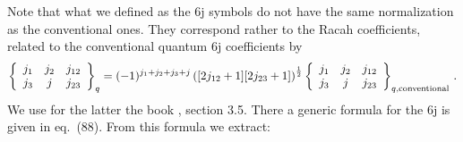 \documentclass[11pt]{article}
\begin{document}
Note that what we defined as the 6j symbols do not have the same normalization as the conventional ones. They correspond rather to the Racah coefficients, related to the conventional quantum 6j coefficients by 
\begin{equation}
 \left\{  \begin{array}{ccc}
  j_1 & j_2 & j_{12} \\ j_3 & j & j_{23}  \\ \end{array}   \right\}_q =  (-1)^{j_1 + j_2 + j_3 + j} \left( [2 j_{12} + 1][2 j_{23} +1] \right)^{1 \over 2}\left\{  \begin{array}{ccc}
  j_1 & j_2 & j_{12} \\ j_3 & j & j_{23}  \\ \end{array}   \right\}_{q, \text{conventional}} \,.
 \end{equation}
We use for the latter the book \cite{qgroups}, section 3.5. There a generic formula for the 6j is given in eq.~(88).
From this formula we extract:
\end{document}
